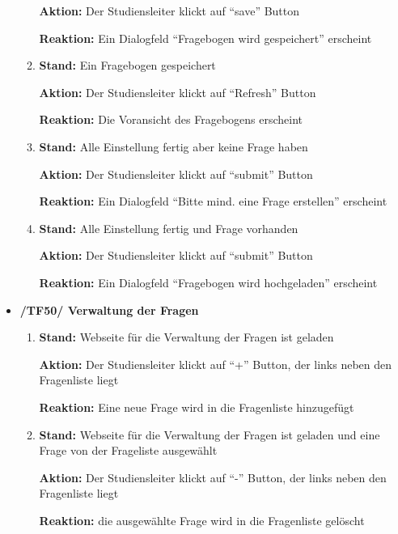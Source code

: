 \documentclass[a4paper]{scrreprt}
\begin{document}
\begin{itemize}
\begin{enumerate}
                              \par \textbf{Aktion: }Der \gls{Studiensleiter} klickt auf ``save'' Button
                              \par \textbf{Reaktion: }Ein Dialogfeld ``Fragebogen wird gespeichert'' erscheint
                        \item \par \textbf{Stand: }Ein Fragebogen gespeichert
                              \par \textbf{Aktion: }Der \gls{Studiensleiter} klickt auf ``Refresh'' Button
                              \par \textbf{Reaktion: }Die Voransicht des Fragebogens erscheint
                        \item \par \textbf{Stand: }Alle Einstellung fertig aber keine Frage haben
                              \par \textbf{Aktion: }Der \gls{Studiensleiter} klickt auf ``submit'' Button
                              \par \textbf{Reaktion: }Ein Dialogfeld ``Bitte mind. eine Frage erstellen'' erscheint
                        \item \par \textbf{Stand: }Alle Einstellung fertig und Frage vorhanden
                              \par \textbf{Aktion: }Der \gls{Studiensleiter} klickt auf ``submit'' Button
                              \par \textbf{Reaktion: }Ein Dialogfeld ``Fragebogen wird hochgeladen'' erscheint
                    \end{enumerate}

                \item \textbf{/TF50/ Verwaltung der Fragen}
                        \begin{enumerate}
                        \item \par \textbf{Stand: } Webseite für die Verwaltung der Fragen ist geladen
                              \par \textbf{Aktion: } Der \gls{Studiensleiter} klickt auf ``+'' Button, der links neben den Fragenliste liegt
                              \par \textbf{Reaktion: } Eine neue Frage wird in die Fragenliste hinzugefügt

                        \item \par \textbf{Stand: } Webseite für die Verwaltung der Fragen ist geladen und eine Frage von der Frageliste ausgewählt
                              \par \textbf{Aktion: }  Der \gls{Studiensleiter} klickt auf ``-'' Button, der links neben den Fragenliste liegt
                              \par \textbf{Reaktion: } die ausgewählte Frage wird in die Fragenliste gelöscht


\end{enumerate}
\end{itemize}
\end{document}

